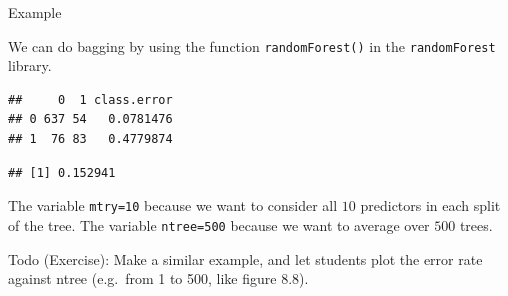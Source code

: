 \documentclass[10pt,ignorenonframetext,]{beamer}
\newenvironment{Shaded}{\begin{snugshade}}{\end{snugshade}}
\newcommand{\KeywordTok}[1]{\textcolor[rgb]{0.13,0.29,0.53}{\textbf{#1}}}
\newcommand{\DataTypeTok}[1]{\textcolor[rgb]{0.13,0.29,0.53}{#1}}
\newcommand{\DecValTok}[1]{\textcolor[rgb]{0.00,0.00,0.81}{#1}}
\newcommand{\StringTok}[1]{\textcolor[rgb]{0.31,0.60,0.02}{#1}}
\newcommand{\OtherTok}[1]{\textcolor[rgb]{0.56,0.35,0.01}{#1}}
\newcommand{\OperatorTok}[1]{\textcolor[rgb]{0.81,0.36,0.00}{\textbf{#1}}}
\newcommand{\NormalTok}[1]{#1}
\begin{document}
\begin{frame}[fragile]

\begin{block}{Example}

\vspace{1mm}

We can do bagging by using the function \texttt{randomForest()} in the
\texttt{randomForest} library.

\scriptsize

\begin{Shaded}
\end{Shaded}

\begin{verbatim}
##     0  1 class.error
## 0 637 54   0.0781476
## 1  76 83   0.4779874
\end{verbatim}

\begin{Shaded}
\end{Shaded}

\begin{verbatim}
## [1] 0.152941
\end{verbatim}

\normalsize

The variable \texttt{mtry=10} because we want to consider all \(10\)
predictors in each split of the tree. The variable \texttt{ntree=500}
because we want to average over \(500\) trees.

Todo (Exercise): Make a similar example, and let students plot the error
rate against ntree (e.g.~from 1 to 500, like figure 8.8).

\end{block}

\end{frame}
\end{document}
